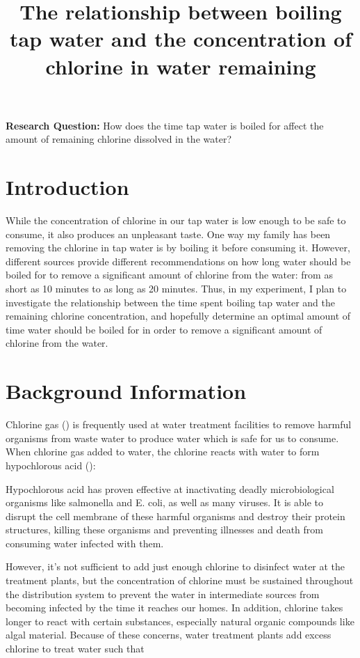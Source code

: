 \documentclass[11pt]{article}
\title{The relationship between boiling tap water and the concentration of chlorine in water remaining}
\author{}
\date{}
\begin{document}
\maketitle

\noindent\textbf{Research Question:} How does the time tap water is boiled for affect the amount of remaining chlorine dissolved in the water?

\section{Introduction}

While the concentration of chlorine in our tap water is low enough to be safe to consume, it also produces an unpleasant taste. One way my family has been removing the chlorine in tap water is by boiling it before consuming it. However, different sources provide different recommendations on how long water should be boiled for to remove a significant amount of chlorine from the water: from as short as 10 minutes to as long as 20 minutes. Thus, in my experiment, I plan to investigate the relationship between the time spent boiling tap water and the remaining chlorine concentration, and hopefully determine an optimal amount of time water should be boiled for in order to remove a significant amount of chlorine from the water.

\section{Background Information}

Chlorine gas () is frequently used at water treatment facilities to remove harmful organisms from waste water to produce water which is safe for us to consume. When chlorine gas added to water, the chlorine reacts with water to form hypochlorous acid ():

\centerline{}

Hypochlorous acid has proven effective at inactivating deadly microbiological organisms like salmonella and E. coli, as well as many viruses. It is able to disrupt the cell membrane of these harmful organisms and destroy their protein structures, killing these organisms and preventing illnesses and death from consuming water infected with them.

However, it's not sufficient to add just enough chlorine to disinfect water at the treatment plants, but the concentration of chlorine must be sustained throughout the distribution system to prevent the water in intermediate sources from becoming infected by the time it reaches our homes. In addition, chlorine takes longer to react with certain substances, especially natural organic compounds like algal material. Because of these concerns, water treatment plants add excess chlorine to treat water such that
\end{document}
